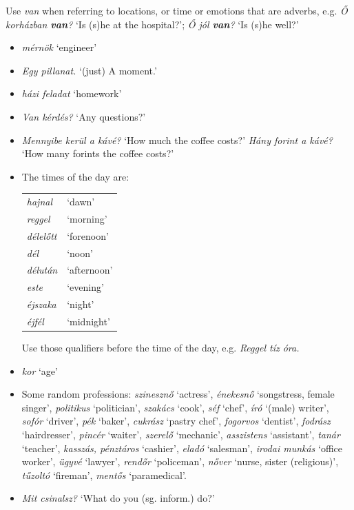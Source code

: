 \documentclass[a4paper,11pt]{article}
\begin{document}
\noindent Use \emph{van} when referring to locations, or time or
emotions that are adverbs, e.g. \emph{Ő korházban \textbf{van}?} `Is
(s)he at the hospital?'; \emph{Ő jól \textbf{van}?} `Is (s)he well?'

\begin{itemize}

  \item \emph{mérnök} `engineer'

  \item \emph{Egy pillanat.} `(just) A moment.'

  \item \emph{házi feladat} `homework'

  \item \emph{Van kérdés?} `Any questions?'

  \item \emph{Mennyibe kerül a kávé?} `How much the coffee costs?'
    \emph{Hány forint a kávé?} `How many forints the coffee costs?'

    \item The times of the day are:
    \begin{center}
      \begin{tabular}{>{\itshape}ll}
        hajnal   & `dawn' \\
        reggel   & `morning' \\
        délelőtt & `forenoon' \\
        dél      & `noon' \\
        délután  & `afternoon' \\
        este     & `evening' \\
        éjszaka  & `night' \\
        éjfél    & `midnight'
      \end{tabular}
    \end{center}
    Use those qualifiers before the time of the day, e.g. \emph{Reggel
    tíz óra.}

  \item \emph{kor} `age'

  \item Some random professions: \emph{szinesznő} `actress',
    \emph{énekesnő} `songstress, female singer', \emph{politikus}
    `politician', \emph{szakács} `cook', \emph{séf} `chef', \emph{író}
    `(male) writer', \emph{sofór} `driver', \emph{pék} `baker',
    \emph{cukrász} `pastry chef', \emph{fogorvos} `dentist',
    \emph{fodrász} `hairdresser', \emph{pincér} `waiter',
    \emph{szerelő} `mechanic', \emph{asszistens} `assistant',
    \emph{tanár} `teacher', \emph{kasszás, pénztáros} `cashier',
    \emph{eladó} `salesman', \emph{irodai munkás} `office worker',
    \emph{ügyvé} `lawyer', \emph{rendőr} `policeman', \emph{nőver}
    `nurse, sister (religious)', \emph{tűzoltó} `fireman',
    \emph{mentős} `paramedical'.

  \item \emph{Mit csinalsz?} `What do you (sg. inform.) do?'

\end{itemize}
\end{document}

